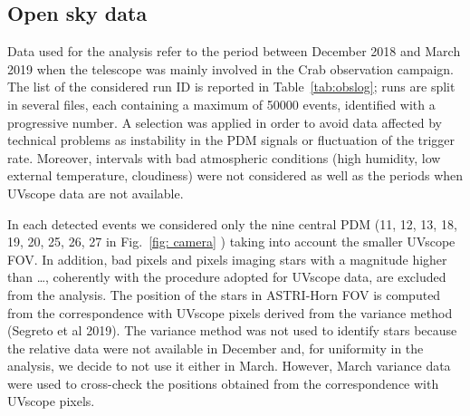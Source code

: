 \subsection{Open sky data} 
\label{subs:skydata}

Data used for the analysis refer to the period between December 2018 and March 2019 when the telescope was mainly involved in the Crab observation campaign. The list of the considered run ID is reported in Table~\ref{tab:obslog}; runs are split in several files, each containing a maximum of 50000 events, identified with a progressive number.
A selection was applied in order to avoid data affected by technical problems as instability in the PDM signals or fluctuation of the trigger rate. Moreover, intervals with bad atmospheric conditions 
(high humidity, low external temperature, cloudiness) were not considered as well as the periods when UVscope data are not available.

In each detected events we considered only the nine central PDM (11, 12, 13, 18, 19, 20, 25, 26, 27 in Fig.~\ref{fig: camera} ) taking into account the smaller UVscope FOV.  In addition, bad pixels and pixels imaging stars with a magnitude higher than …, coherently with the procedure adopted for UVscope data, are excluded from the analysis. The position of the stars in ASTRI-Horn FOV is computed from the correspondence with UVscope pixels derived from the variance method (Segreto et al 2019). 
The variance method was not used to identify stars because the relative data were not available in December and, for uniformity in the analysis, we decide to not use it either in March.  However, March variance data were used to cross-check the positions obtained from the correspondence with UVscope pixels.


